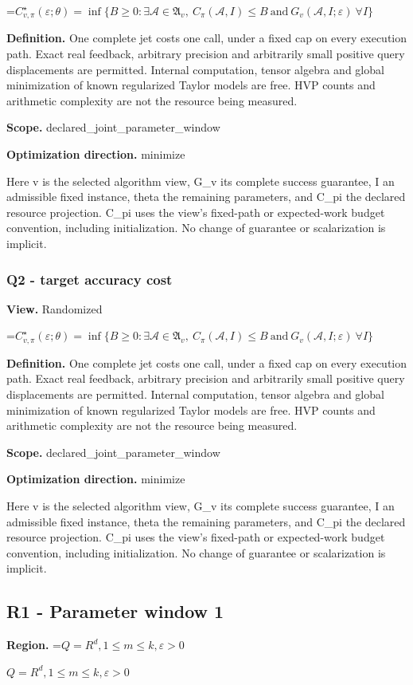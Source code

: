 \documentclass[10pt,a4paper]{article}
\newcommand{\AtlasMath}[1]{\par\begingroup\centering\setbox0=\hbox{$\displaystyle #1$}\ifdim\wd0>1.4\linewidth\typeout{ATLAS WIDE FORMULA: \the\wd0}\fi\ifdim\wd0>\linewidth\resizebox{\linewidth}{!}{\box0}\else\box0\fi\par\endgroup}
\newcommand{\AtlasInlineMath}[1]{\begingroup\setbox0=\hbox{$#1$}\ifdim\wd0>.4\linewidth\endgroup\AtlasMath{#1}\else\endgroup$#1$\fi}
\begin{document}
\AtlasMath{C^\star_{v,\pi}(\varepsilon;\theta)=\inf\{B\ge0:\exists\mathcal A\in\mathfrak A_v,\ C_\pi(\mathcal A,I)\le B\ \text{and}\ G_v(\mathcal A,I;\varepsilon)\ \forall I\}}
\textbf{Definition.} One complete jet costs one call, under a fixed cap on every execution path. Exact real feedback, arbitrary precision and arbitrarily small positive query displacements are permitted. Internal computation, tensor algebra and global minimization of known regularized Taylor models are free. HVP counts and arithmetic complexity are not the resource being measured.

\textbf{Scope.} declared\_joint\_parameter\_window

\textbf{Optimization direction.} minimize

Here v is the selected algorithm view, G\_v its complete success guarantee, I an admissible fixed instance, theta the remaining parameters, and C\_pi the declared resource projection. C\_pi uses the view's fixed-path or expected-work budget convention, including initialization. No change of guarantee or scalarization is implicit.

\subsubsection{Q2 - target accuracy cost}
\textbf{View.} Randomized

\AtlasMath{C^\star_{v,\pi}(\varepsilon;\theta)=\inf\{B\ge0:\exists\mathcal A\in\mathfrak A_v,\ C_\pi(\mathcal A,I)\le B\ \text{and}\ G_v(\mathcal A,I;\varepsilon)\ \forall I\}}
\textbf{Definition.} One complete jet costs one call, under a fixed cap on every execution path. Exact real feedback, arbitrary precision and arbitrarily small positive query displacements are permitted. Internal computation, tensor algebra and global minimization of known regularized Taylor models are free. HVP counts and arithmetic complexity are not the resource being measured.

\textbf{Scope.} declared\_joint\_parameter\_window

\textbf{Optimization direction.} minimize

Here v is the selected algorithm view, G\_v its complete success guarantee, I an admissible fixed instance, theta the remaining parameters, and C\_pi the declared resource projection. C\_pi uses the view's fixed-path or expected-work budget convention, including initialization. No change of guarantee or scalarization is implicit.

\subsection{R1 - Parameter window 1}
\textbf{Region.} \AtlasInlineMath{Q=R^d,1\le m\le k,\varepsilon>0}
\end{document}
